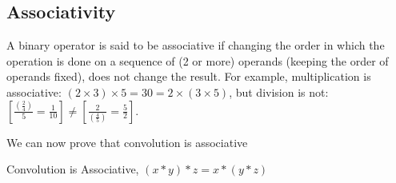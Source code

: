 \subsection{Associativity}

A binary operator is said to be associative if changing the order in which the operation is done on a sequence of (2 or more) operands (keeping the order of operands fixed), does not change the result. For example, multiplication is associative: $(2\times 3)\times 5=30=2\times (3\times 5)$, but division is not: $\left[\frac{(\frac{2}{4})}{5}=\frac{1}{10}\right] \neq
\left[\frac{2}{(\frac{4}{5})} = \frac{5}{2}\right]$.

\vspace{\baselineskip}
We can now prove that convolution is associative

\begin{theorem}
Convolution is Associative, $(x\ast y)\ast z = x\ast (y\ast z)$
\end{theorem}

